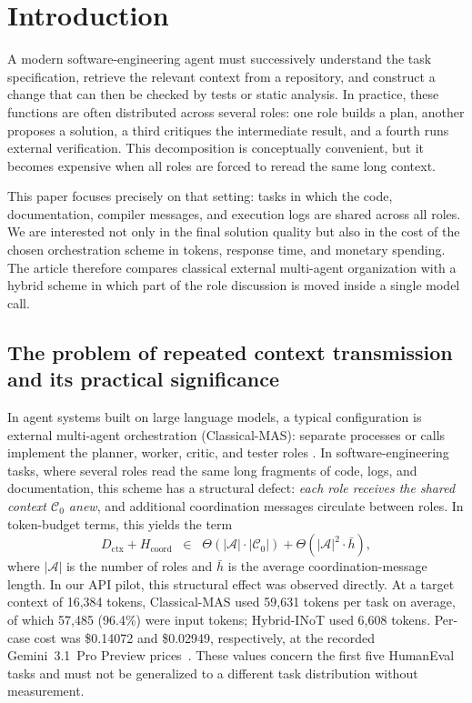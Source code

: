 \section{Introduction}\label{sec:intro}

A modern software-engineering agent must successively understand the task specification, retrieve the relevant context from a repository, and construct a change that can then be checked by tests or static analysis. In practice, these functions are often distributed across several roles: one role builds a plan, another proposes a solution, a third critiques the intermediate result, and a fourth runs external verification. This decomposition is conceptually convenient, but it becomes expensive when all roles are forced to reread the same long context.

This paper focuses precisely on that setting: tasks in which the code, documentation, compiler messages, and execution logs are shared across all roles. We are interested not only in the final solution quality but also in the cost of the chosen orchestration scheme in tokens, response time, and monetary spending. The article therefore compares classical external multi-agent organization with a hybrid scheme in which part of the role discussion is moved inside a single model call.

\subsection{The problem of repeated context transmission and its practical significance}

In agent systems built on large language models, a typical configuration is external multi-agent orchestration (\textrm{Classical-MAS}): separate processes or calls implement the planner, worker, critic, and tester roles \cite{hong2023metagpt,qian2023chatdev,guo2024survey}. In software-engineering tasks, where several roles read the same long fragments of code, logs, and documentation, this scheme has a structural defect: \emph{each role receives the shared context $\mathcal{C}_0$ anew}, and additional coordination messages circulate between roles. In token-budget terms, this yields the term
\[
D_{\text{ctx}}+H_{\text{coord}} \;\;\in\;\; \Theta(|\mathcal{A}|\cdot|\mathcal{C}_0|)+\Theta(|\mathcal{A}|^2\cdot\bar{h}),
\]
where $|\mathcal{A}|$ is the number of roles and $\bar{h}$ is the average coordination-message length. In our API pilot, this structural effect was observed directly. At a target context of 16,384 tokens, \textrm{Classical-MAS} used 59,631 tokens per task on average, of which 57,485 (96.4\%) were input tokens; \textrm{Hybrid-INoT} used 6,608 tokens. Per-case cost was \$0.14072 and \$0.02949, respectively, at the recorded Gemini~3.1~Pro Preview prices~\cite{openrouterpro2026}. These values concern the first five HumanEval tasks and must not be generalized to a different task distribution without measurement.

